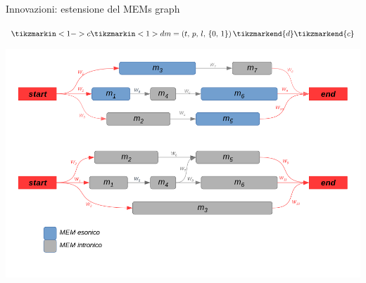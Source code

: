 \documentclass{beamer}
\begin{document}
\begin{tframe}{Innovazioni: estensione del MEMs graph}
  \begin{center}
    $\tikzmarkin<1->{c}\tikzmarkin<1>{d}
    m=(t,\,p,\,l,\,\{0,\,1\})\,
    \tikzmarkend{d}\tikzmarkend{c}$
  \end{center}
  \begin{center}
    \includegraphics[scale = 0.27]{img/memi.png}
  \end{center}
\end{tframe}




\end{document}
